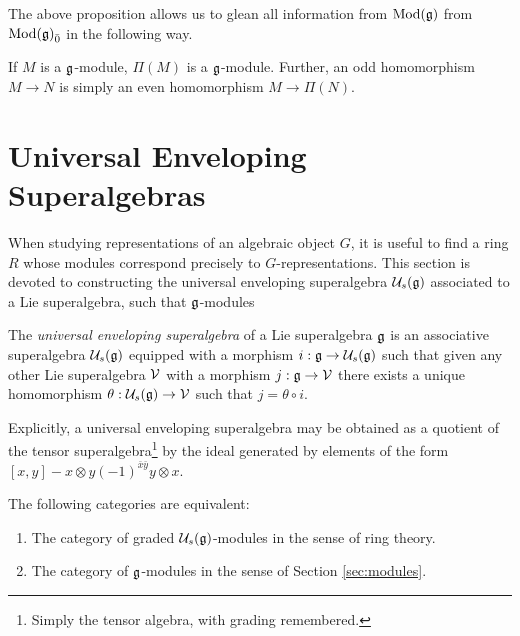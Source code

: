 The above proposition allows us to glean all information from $\operatorname{Mod}(\mathfrak{g})$ from ${\operatorname{Mod}(\mathfrak{g})}_{\bar{0}}$ in the following way.
\begin{corollary}
  If $M$ is a $\mathfrak{g}$-module, $\Pi(M)$ is a $\mathfrak{g}$-module. Further, an odd homomorphism $M \to N$ is simply an even homomorphism $M \to \Pi(N)$.
\end{corollary}


\section{Universal Enveloping Superalgebras}
\label{sec:universal-enveloping-superalgebras}

When studying representations of an algebraic object $G$, it is useful to find a ring $R$ whose modules correspond precisely to $G$-representations. This section is devoted to constructing the universal enveloping superalgebra $\mathcal{U}_s(\mathfrak{g})$ associated to a Lie superalgebra, such that $\mathfrak{g}$-modules 
\begin{definition}
  The \emph{universal enveloping superalgebra} of a Lie superalgebra $\mathfrak{g}$ is an associative superalgebra $\mathcal{U}_s(\mathfrak{g})$ equipped with a morphism $i: \mathfrak{g} \to \mathcal{U}_s(\mathfrak{g})$ such that given any other Lie superalgebra $\mathcal{V}$ with a morphism $j: \mathfrak{g} \to \mathcal{V}$ there exists a unique homomorphism $\theta: \mathcal{U}_s(\mathfrak{g}) \to \mathcal{V}$ such that $j = \theta \circ i$.

  Explicitly, a universal enveloping superalgebra may be obtained as a quotient of the tensor superalgebra\footnote{Simply the tensor algebra, with grading remembered.} by the ideal generated by elements of the form $[x,y] - x \otimes y (-1)^{\bar x \bar y} y \otimes x$.
\end{definition}

\begin{proposition}
  The following categories are equivalent:
  \begin{enumerate}
  \item The category of graded $\mathcal{U}_s(\mathfrak{g})$-modules in the sense of ring theory.
  \item The category of $\mathfrak{g}$-modules in the sense of Section \ref{sec:modules}.
\end{enumerate}
\end{proposition}


